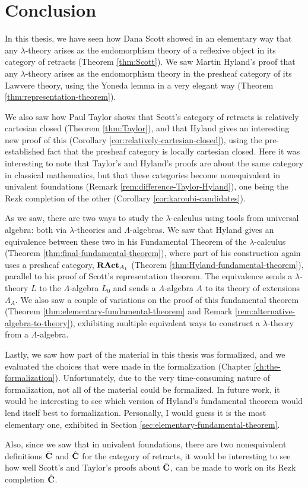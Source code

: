 \chapter{Conclusion}
In this thesis, we have seen how Dana Scott showed in an elementary way that any $ \lambda $-theory arises as the endomorphism theory of a reflexive object in its category of retracts (Theorem \ref{thm:Scott}). We saw Martin Hyland's proof that any $ \lambda $-theory arises as the endomorphism theory in the presheaf category of its Lawvere theory, using the Yoneda lemma in a very elegant way (Theorem \ref{thm:representation-theorem}).

We also saw how Paul Taylor shows that Scott's category of retracts is relatively cartesian closed (Theorem \ref{thm:Taylor}), and that Hyland gives an interesting new proof of this (Corollary \ref{cor:relatively-cartesian-closed}), using the pre-established fact that the presheaf category is locally cartesian closed. Here it was interesting to note that Taylor's and Hyland's proofs are about the same category in classical mathematics, but that these categories become nonequivalent in univalent foundations (Remark \ref{rem:difference-Taylor-Hyland}), one being the Rezk completion of the other (Corollary \ref{cor:karoubi-candidates}).

As we saw, there are two ways to study the $ \lambda $-calculus using tools from universal algebra: both via $ \lambda $-theories and $ \Lambda $-algebras. We saw that Hyland gives an equivalence between these two in his Fundamental Theorem of the $ \lambda $-calculus (Theorem \ref{thm:final-fundamental-theorem}), where part of his construction again uses a presheaf category, $ \mathbf{RAct}_{A_1} $ (Theorem \ref{thm:Hyland-fundamental-theorem}), parallel to his proof of Scott's representation theorem. The equivalence sends a $ \lambda $-theory $ L $ to the $ \Lambda $-algebra $ L_0 $ and sends a $ \Lambda $-algebra $ A $ to its theory of extensions $ \Lambda_A $. We also saw a couple of variations on the proof of this fundamental theorem (Theorem \ref{thm:elementary-fundamental-theorem} and Remark \ref{rem:alternative-algebra-to-theory}), exhibiting multiple equivalent ways to construct a $ \lambda $-theory from a $ \Lambda $-algebra.

Lastly, we saw how part of the material in this thesis was formalized, and we evaluated the choices that were made in the formalization (Chapter \ref{ch:the-formalization}). Unfortunately, due to the very time-consuming nature of formalization, not all of the material could be formalized. In future work, it would be interesting to see which version of Hyland's fundamental theorem would lend itself best to formalization. Personally, I would guess it is the most elementary one, exhibited in Section \ref{sec:elementary-fundamental-theorem}.

Also, since we saw that in univalent foundations, there are two nonequivalent definitions $ \bar {\mathbf{C}} $ and $ \hat {\mathbf{C}} $ for the category of retracts, it would be interesting to see how well Scott's and Taylor's proofs about $ \bar {\mathbf{C}} $, can be made to work on its Rezk completion $ \hat {\mathbf{C}} $.
